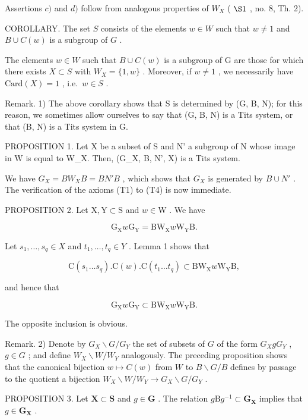 Assertions \(c)\) and \(d)\) follow from analogous properties of \(W_X\) ( \(\S 1\) , no. 8, Th. 2).

COROLLARY. The set \(S\) consists of the elements \(w \in W\) such that \(w \neq 1\) and \(B \cup C(w)\) is a subgroup of \(G\) .

The elements \(w \in W\) such that \(B \cup C(w)\) is a subgroup of G are those for which there exists \(X \subset S\) with \(W_{X} = \{1, w\}\) . Moreover, if \(w \neq 1\) , we necessarily have \(\text{Card}(X) = 1\) , i.e.~\(w \in S\) .

Remark. 1) The above corollary shows that S is determined by (G, B, N); for this reason, we sometimes allow ourselves to say that (G, B, N) is a Tits system, or that (B, N) is a Tits system in G.

PROPOSITION 1. Let X be a subset of S and N' a subgroup of N whose image in W is equal to W\_X. Then, (G\_X, B, N', X) is a Tits system.

We have \(G_{X} = BW_{X}B = BN'B\) , which shows that \(G_{X}\) is generated by \(B \cup N'\) . The verification of the axioms (T1) to (T4) is now immediate.

PROPOSITION 2. Let \(\mathrm{X}, \mathrm{Y} \subset \mathrm{S}\) and \(w \in \mathrm{W}\) . We have

\[
\mathrm{G} _ {\mathrm{X}} w \mathrm{G} _ {\mathrm{Y}} = \mathrm{BW} _ {\mathrm{X}} w \mathrm{W} _ {\mathrm{Y}} \mathrm{B}.
\]

Let \(s_1, \ldots, s_q \in X\) and \(t_1, \ldots, t_q \in Y\) . Lemma 1 shows that

\[
\mathrm{C} (s _ {1} \dots s _ {q}). \mathrm{C} (w). \mathrm{C} (t _ {1} \dots t _ {q}) \subset \mathrm{BW} _ {\mathrm{X}} w \mathrm{W} _ {\mathrm{Y}} \mathrm{B},
\]

and hence that

\[
\mathrm{G} _ {\mathrm{X}} w \mathrm{G} _ {\mathrm{Y}} \subset \mathrm{BW} _ {\mathrm{X}} w \mathrm{W} _ {\mathrm{Y}} \mathrm{B}.
\]

The opposite inclusion is obvious.

Remark. 2) Denote by \(G_X \backslash G / G_Y\) the set of subsets of \(G\) of the form \(G_X gG_Y\) , \(g \in G\) ; and define \(W_X \backslash W / W_Y\) analogously. The preceding proposition shows that the canonical bijection \(w \mapsto C(w)\) from \(W\) to \(B \backslash G / B\) defines by passage to the quotient a bijection \(W_X \backslash W / W_Y \to G_X \backslash G / G_Y\) .

PROPOSITION 3. Let \(\mathbf{X} \subset \mathbf{S}\) and \(g \in \mathbf{G}\) . The relation \(g\mathrm{B}g^{-1} \subset \mathbf{G}_{\mathbf{X}}\) implies that \(g \in \mathbf{G}_{\mathbf{X}}\) .

